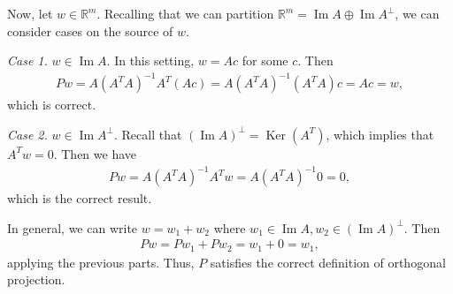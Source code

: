 \documentclass{article}
\newcommand{\RR}{\mathbb{R}}
\DeclareMathOperator{\Ker}{Ker}
\DeclareMathOperator{\Ima}{Im}
\begin{document}
\begin{enumerate}
    Now, let $w \in \RR^m$.  Recalling that we can partition $\RR^m = \Ima A \oplus \Ima A^{\perp}$, we can consider cases on the source of $w$.

    {\it Case 1.} $w \in \Ima A$.  In this setting, $w = A c$ for some $c$.  Then
    \begin{align*}
      Pw = A (A^T A)^{-1} A^T (Ac) = A (A^T A)^{-1} (A^T A) c = Ac = w,
    \end{align*}
    which is correct.

    {\it Case 2.} $w \in \Ima A^{\perp}$.  Recall that $(\Ima A)^{\perp} = \Ker (A^T)$, which implies that $A^T w = 0$.  Then we have
    \begin{align*}
      Pw = A (A^T A)^{-1} A^T w = A (A^T A)^{-1} 0  = 0,
    \end{align*}
    which is the correct result.

    In general, we can write $w = w_1 + w_2$ where $w_1 \in \Ima A, w_2 \in (\Ima A)^{\perp}$.  Then
    \begin{align*}
      Pw = Pw_1 + Pw_2 = w_1 + 0 = w_1,
    \end{align*}
    applying the previous parts.  Thus, $P$ satisfies the correct definition of orthogonal projection.

\end{enumerate}
\end{document}

